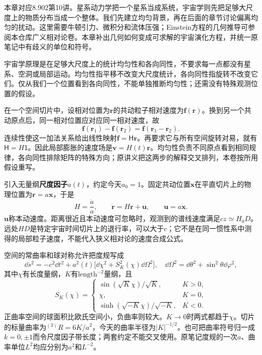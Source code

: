 本章对应8.902第10讲。星系动力学把一个星系当成系统，宇宙学则先把足够大尺度上的物质分布当成一个整体。我们先建立均匀背景，再在后面的章节讨论偏离均匀的扰动。这里需要牛顿引力、微积分和流体压强；Einstein方程的几何推导可参阅本仓库广义相对论卷。本章补出几何如何变成可求解的宇宙演化方程，并统一原笔记中有歧义的单位和符号。

宇宙学原理是在足够大尺度上的统计均匀性和各向同性，不要求每一点都没有星系、空洞或局部运动。均匀性指平移不改变大尺度统计，各向同性指旋转不改变它们。仅从我们一个位置看到各向同性，不能单独推断均匀性；还需没有特殊观测位置的假设。

在一个空间切片中，设相对位置为$\mathbf r$的共动粒子相对速度为$\mathbf f(\mathbf r)$。换到另一个共动原点后，同一相对位置应对应同一相对速度，故
\[
 \mathbf f(\mathbf r_1)-\mathbf f(\mathbf r_2)=\mathbf f(\mathbf r_1-\mathbf r_2).
\]
连续性使这一加法关系给出线性映射$\mathbf f=\mathsf H\mathbf r$。再要求它与所有空间旋转对易，就有$\mathsf H=H\mathsf1$。因此局部膨胀的速度场是$\mathbf v=H(t)\mathbf r$。均匀性负责不同原点看到相同规律，各向同性排除矩阵的特殊方向；原讲义把这两步的解释交叉排列，本卷按所用假设重写。

引入无量纲\textbf{尺度因子}$a(t)$，约定今天$a_0=1$。固定共动位置$\mathbf x$在平直切片上的物理位置为$\mathbf r=a\mathbf x$，于是
\[
 H=\frac{\dot a}{a},\qquad \dot{\mathbf r}=H\mathbf r+\mathbf u,
 \qquad\mathbf u=a\dot{\mathbf x}.
\]
$\mathbf u$称本动速度。距离很近且本动速度可忽略时，观测到的谱线速度满足$cz\simeq H_0D$。远处$HD$是特定宇宙时间切片上的退行率，可以大于$c$；它不是在同一惯性系中测得的局部粒子速度，不能代入狭义相对论的速度合成公式。

空间的常曲率和球对称允许把度规写成
\begin{equation}\label{eq:astro-flrw}
 \dd s^2=-c^2\dd t^2+a^2(t)\bigl[\dd\chi^2+S_K^2(\chi)\dd\Omega^2\bigr],
 \quad \dd\Omega^2=\dd\theta^2+\sin^2\theta\dd\varphi^2,
\end{equation}
其中$\chi$有长度量纲，$K$有$\mathrm{length}^{-2}$量纲，且
\[
 S_K(\chi)=\begin{cases}
 \sin(\sqrt K\chi)/\sqrt K,&K>0,\\
 \chi,&K=0,\\
 \sinh(\sqrt{-K}\chi)/\sqrt{-K},&K<0.
 \end{cases}
\]
正曲率空间的球面积比欧氏空间小，负曲率则较大。$K\to0$时两式都趋于$\chi$。切片的标量曲率为${}^{(3)}R=6K/a^2$，今天的曲率半径为$|K|^{-1/2}$。也可把曲率符号归一成$k=0,\pm1$而令尺度因子带长度；两套约定不能交叉使用。原笔记度规的一次$a$、曲率单位$L^2$均应分别为$a^2$和$L^{-2}$。

